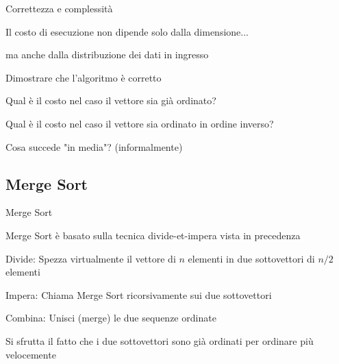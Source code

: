 \begin{frame}{Correttezza e complessità}

\vspace{-9pt}
\begin{myboxtitle}
\BI
\item Il costo di esecuzione non dipende solo dalla dimensione...
\item ma anche dalla distribuzione dei dati in ingresso
\EI
\end{myboxtitle}

\begin{myboxtitle}[Domande]
\BI
\item Dimostrare che l'algoritmo è corretto
\item Qual è il costo nel caso il vettore sia già ordinato?
\item Qual è il costo nel caso il vettore sia ordinato in ordine inverso?
\item Cosa succede "in media"? (informalmente)
\EI
\end{myboxtitle}

\end{frame}

\subsection{Merge Sort}

\begin{frame}{Merge Sort}
	
\vspace{-9pt}
\begin{myboxtitle}
Merge Sort è basato sulla tecnica \alert{divide-et-impera} vista in precedenza	
\BI
\item \alert{Divide}: Spezza virtualmente il vettore di $n$ elementi in due sottovettori di $n/2$ elementi
\item \alert{Impera}: Chiama Merge Sort ricorsivamente sui due sottovettori
\item \alert{Combina}: Unisci (\alert{merge}) le due sequenze ordinate 
\EI
\end{myboxtitle}

\begin{myboxtitle}[Idea]
Si sfrutta il fatto che i due sottovettori sono già ordinati per ordinare più velocemente
\end{myboxtitle}
	
\end{frame}



